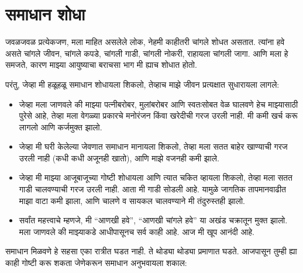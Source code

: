 \chapter{समाधान शोधा}

जवळजवळ प्रत्येकजण, मला माहित असलेले लोक, नेहमी काहीतरी चांगले शोधत असतात.  
त्यांना हवे असते चांगले जीवन, चांगले कपडे, चांगली गाडी, चांगली नोकरी,  
राहायला चांगली जागा. आणि मला हे समजते, कारण माझ्या आयुष्याचा बराचसा भाग  
मी ह्याच शोधात होतो.  

परंतु, जेव्हा मी हळूहळू समाधान शोधायला शिकलो, तेव्हाच माझे जीवन  
प्रत्यक्षात सुधारायला लागले:

\begin{itemize}
\item जेव्हा मला जाणवले की माझ्या पत्नीबरोबर, मुलांबरोबर आणि स्वतःसोबत वेळ घालवणे हेच माझ्यासाठी पुरेसे आहे,  
तेव्हा मला वेगळ्या प्रकारचे मनोरंजन किंवा खरेदीची गरज उरली नाही.  
मी कमी खर्च करू लागलो आणि कर्जमुक्त झालो.  

\item जेव्हा मी घरी केलेल्या जेवणात समाधान मानायला शिकलो,  
तेव्हा मला सतत बाहेर खाण्याची गरज उरली नाही (कधी कधी अजूनही खातो),  
आणि माझे वजनही कमी झाले.  

\item जेव्हा मी माझ्या आजूबाजूच्या गोष्टी शोधायला आणि त्यात चकित व्हायला शिकलो,  
तेव्हा मला सतत गाडी चालवण्याची गरज उरली नाही. आता मी गाडी सोडली आहे.  
यामुळे जागतिक तापमानवाढीत माझा वाटा कमी झाला, आणि चालणे व सायकल चालवण्याने मी तंदुरुस्तही झालो.  

\item सर्वांत महत्त्वाचे म्हणजे, मी “आणखी हवे”, “आणखी चांगले हवे” या अखंड चक्रातून मुक्त झालो.  
मला जाणवले की माझ्याकडे आधीपासूनच सर्व काही आहे.  
आज मी खूप आनंदी आहे.  
\end{itemize}

समाधान मिळवणे हे सहसा एका रात्रीत घडत नाही.  
ते थोड्या थोड्या प्रमाणात घडते.  
आजपासून तुम्ही ह्या काही गोष्टी करू शकता जेणेकरून समाधान अनुभवायला शकाल:

